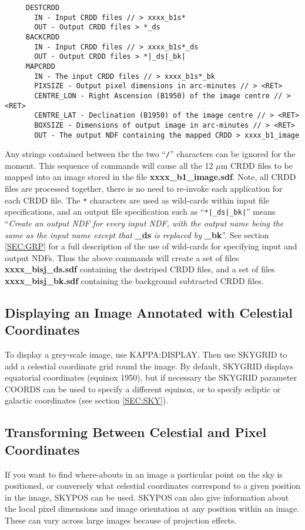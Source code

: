 \small
\begin{verbatim}
     DESTCRDD 
       IN - Input CRDD files // > xxxx_b1s*
       OUT - Output CRDD files > *_ds
     BACKCRDD 
       IN - Input CRDD files // > xxxx_b1s*_ds
       OUT - Output CRDD files > *|_ds|_bk|
     MAPCRDD
       IN - The input CRDD files // > xxxx_b1s*_bk
       PIXSIZE - Output pixel dimensions in arc-minutes // > <RET>
       CENTRE_LON - Right Ascension (B1950) of the image centre // > <RET>
       CENTRE_LAT - Declination (B1950) of the image centre // > <RET>
       BOXSIZE - Dimensions of output image in arc-minutes // > <RET>
       OUT - The output NDF containing the mapped CRDD > xxxx_b1_image
\end{verbatim}
\normalsize

Any strings contained between the the two ``\verb+/+'' characters can be ignored
for the moment. 
This sequence of commands will cause all the 12 $\mu$m {\small CRDD} files to be
mapped into an image stored in the file {\bf xxxx\_b1\_image.sdf}. Note, all
{\small CRDD} files are processed together, there is no need to  re-invoke each
application for each {\small CRDD} file. The \verb+*+ characters are used as
wild-cards within input file specifications, and an output file specification
such as ``\verb+*|_ds|_bk|+'' means ``{\em Create an output {\small NDF} for
every input {\small NDF}, with the output name being the same as the input name
except that} {\bf \_ds} {\em is replaced by} {\bf \_bk}''. See section
\ref{SEC:GRP} for a full description of the use of wild-cards for specifying
input and output {\small NDF}s. Thus the above commands will create a set of
files {\bf xxxx\_bisj\_ds.sdf} containing the destriped {\small CRDD} files, and
a set of files {\bf xxxx\_bisj\_bk.sdf} containing the background subtracted
{\small CRDD} files. 

\subsection{Displaying an Image Annotated with Celestial Coordinates}
To display a grey-scale image, use {\small KAPPA:DISPLAY}. Then use {\small 
SKYGRID} to add a celestial coordinate grid round the image. By default, 
SKYGRID displays equatorial coordinates (equinox 1950), but if necessary the
SKYGRID parameter COORDS can be used to specify a different equinox, or to 
specify ecliptic or galactic coordinates (see section \ref{SEC:SKY}).

\subsection{Transforming Between Celestial and Pixel Coordinates}
If you want to find where-abouts in an image a particular point on the sky is
positioned, or conversely what celestial coordinates correspond to a given 
position in the image, {\small SKYPOS} can be used. {\small SKYPOS} can also 
give information about the local pixel dimensions and image orientation at any 
position within an image. These can vary across large images because of 
projection effects.

